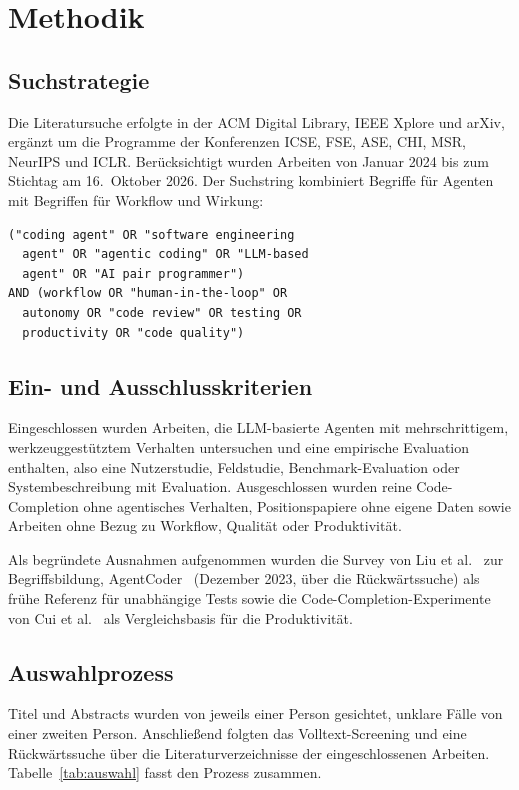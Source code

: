 \section{Methodik}
\label{sec:methodik}

\subsection{Suchstrategie}
Die Literatursuche erfolgte in der ACM Digital Library, IEEE Xplore und arXiv, ergänzt um die Programme der Konferenzen ICSE, FSE, ASE, CHI, MSR, NeurIPS und ICLR. Berücksichtigt wurden Arbeiten von Januar 2024 bis zum Stichtag am 16.~Oktober 2026. Der Suchstring kombiniert Begriffe für Agenten mit Begriffen für Workflow und Wirkung:

\begin{small}
\begin{verbatim}
("coding agent" OR "software engineering
  agent" OR "agentic coding" OR "LLM-based
  agent" OR "AI pair programmer")
AND (workflow OR "human-in-the-loop" OR
  autonomy OR "code review" OR testing OR
  productivity OR "code quality")
\end{verbatim}
\end{small}

\subsection{Ein- und Ausschlusskriterien}
Eingeschlossen wurden Arbeiten, die LLM-basierte Agenten mit mehrschrittigem, werkzeuggestütztem Verhalten untersuchen und eine empirische Evaluation enthalten, also eine Nutzerstudie, Feldstudie, Benchmark-Evaluation oder Systembeschreibung mit Evaluation. Ausgeschlossen wurden reine Code-Completion ohne agentisches Verhalten, Positionspapiere ohne eigene Daten sowie Arbeiten ohne Bezug zu Workflow, Qualität oder Produktivität.

Als begründete Ausnahmen aufgenommen wurden die Survey von Liu et al.~\cite{liu2024agentsurvey} zur Begriffsbildung, AgentCoder~\cite{huang2023agentcoder} (Dezember 2023, über die Rückwärtssuche) als frühe Referenz für unabhängige Tests sowie die Code-Completion-Experimente von Cui et al.~\cite{cui2025genai} als Vergleichsbasis für die Produktivität.

\subsection{Auswahlprozess}
Titel und Abstracts wurden von jeweils einer Person gesichtet, unklare Fälle von einer zweiten Person. Anschließend folgten das Volltext-Screening und eine Rückwärtssuche über die Literaturverzeichnisse der eingeschlossenen Arbeiten. Tabelle~\ref{tab:auswahl} fasst den Prozess zusammen.

